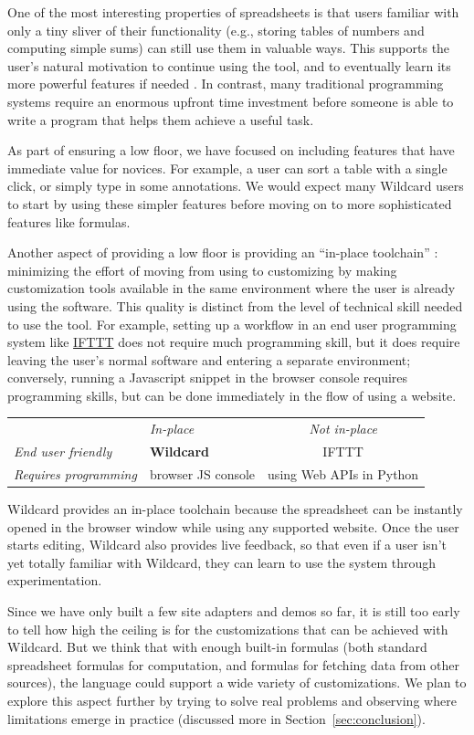 \documentclass[english]{programming}
\begin{document}
One of the most interesting properties of spreadsheets is that users
familiar with only a tiny sliver of their functionality (e.g., storing
tables of numbers and computing simple sums) can still use them in
valuable ways. This supports the user's natural motivation to continue
using the tool, and to eventually learn its more powerful features if
needed \autocite{nardi1991}. In contrast, many traditional programming
systems require an enormous upfront time investment before someone is
able to write a program that helps them achieve a useful task.

As part of ensuring a low floor, we have focused on including features
that have immediate value for novices. For example, a user can sort a
table with a single click, or simply type in some annotations. We would
expect many Wildcard users to start by using these simpler features
before moving on to more sophisticated features like formulas.

Another aspect of providing a low floor is providing an ``in-place
toolchain'' \autocite{2019}: minimizing the effort of moving from using
to customizing by making customization tools available in the same
environment where the user is already using the software. This quality
is distinct from the level of technical skill needed to use the tool.
For example, setting up a workflow in an end user programming system
like \href{https://ifttt.com/}{IFTTT} does not require much programming
skill, but it does require leaving the user's normal software and
entering a separate environment; conversely, running a Javascript
snippet in the browser console requires programming skills, but can be
done immediately in the flow of using a website.

\begin{longtable}[]{@{}llc@{}}
\toprule
\endhead
& \emph{In-place} & \emph{Not in-place}\tabularnewline
\emph{End user friendly} & \textbf{Wildcard} & IFTTT\tabularnewline
\emph{Requires programming} & browser JS console & using Web APIs in
Python\tabularnewline
\bottomrule
\end{longtable}

Wildcard provides an in-place toolchain because the spreadsheet can be
instantly opened in the browser window while using any supported
website. Once the user starts editing, Wildcard also provides live
feedback, so that even if a user isn't yet totally familiar with
Wildcard, they can learn to use the system through experimentation.

Since we have only built a few site adapters and demos so far, it is
still too early to tell how high the ceiling is for the customizations
that can be achieved with Wildcard. But we think that with enough
built-in formulas (both standard spreadsheet formulas for computation,
and formulas for fetching data from other sources), the language could
support a wide variety of customizations. We plan to explore this aspect
further by trying to solve real problems and observing where limitations
emerge in practice (discussed more in Section~\ref{sec:conclusion}).
\end{document}
